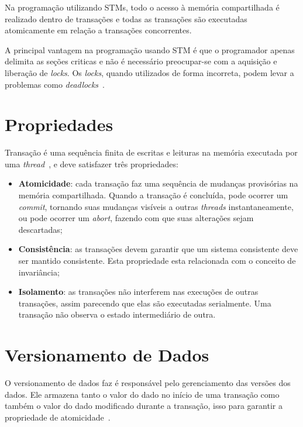 \documentclass[ti]{texufpel} %
\begin{document}
Na programação utilizando STMs, todo o acesso à memória compartilhada é realizado dentro de transações e todas as transações são executadas atomicamente em relação a transações concorrentes.

A principal vantagem na programação usando STM é que o programador apenas delimita as seções criticas e não é necessário preocupar-se com a aquisição e liberação de \emph{locks}. Os \emph{locks}, quando utilizados de forma incorreta, podem levar a problemas como \emph{deadlocks}~\cite{bandeira10}.

\section{Propriedades}

Transação é uma sequência finita de escritas e leituras na memória executada por uma \emph{thread}~\cite{herlihy93}, e deve satisfazer três propriedades:

\begin{itemize}
 \item \textbf{Atomicidade}: cada transação faz uma sequência de mudanças provisórias na memória compartilhada. Quando a transação é concluída, pode ocorrer um \emph{commit}, tornando suas mudanças visíveis a outras \emph{threads} instantaneamente, ou pode ocorrer um \emph{abort}, fazendo com que suas alterações sejam descartadas;

 \item \textbf{Consistência}: as transações devem garantir que um sistema consistente deve ser mantido consistente. Esta propriedade esta relacionada com o conceito de invariância;

 \item \textbf{Isolamento}: as transações não interferem nas execuções de outras transações, assim parecendo que elas são executadas serialmente. Uma transação não observa o estado intermediário de outra.
\end{itemize}

\section{Versionamento de Dados}

O versionamento de dados faz é responsável pelo gerenciamento das versões dos dados. Ele armazena tanto o valor do dado no início de uma transação como também o valor do dado modificado durante a transação, isso para garantir a propriedade de atomicidade~\cite{baldassinTese09}.
\end{document}
